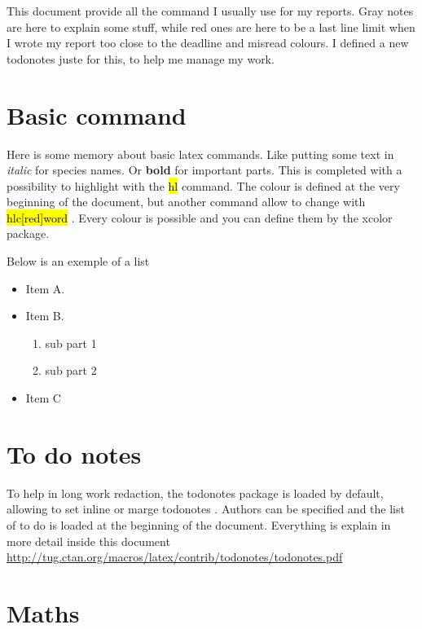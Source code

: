 \documentclass[12pt,a4paper,notitlepage,colorinlistoftodos]{article}
\newcommand{\hlc}[2][yellow]{ {\sethlcolor{#1} \hl{#2}} }
\newcommand{\imp}[1][this!]{ {\todo[inline,color=red]{\textbf{Check: #1}} } }
\begin{document}
This document provide all the command I usually use for my reports. Gray notes are here to explain some stuff, while red ones are here to be a last line limit when I wrote my report too close to the deadline and misread colours. I defined a new todonotes juste for this, to help me manage my work. 

\imp[imp command]

\section{Basic command}

Here is some memory about basic latex commands. Like putting some text in \textit{italic} for species names. Or \textbf{bold} for important parts. This is completed with a possibility to highlight with the \hl{hl} command. The colour is defined at the very beginning of the document, but another command allow to change with \hlc[red]{hlc[red]word}. Every colour is possible and you can define them by the xcolor package.

Below is an exemple of a list

\begin{itemize}
  \item Item A.
  \item Item B.
  \begin{enumerate}
  	\item sub part 1
  	\item sub part 2
  \end{enumerate}
  \item Item C
\end{itemize}

\section{To do notes}

To help in long work redaction, the todonotes package is loaded by default, allowing to set inline or marge todonotes . Authors can be specified and the list of to do is loaded at the beginning of the document. Everything is explain in more detail inside this document \url{http://tug.ctan.org/macros/latex/contrib/todonotes/todonotes.pdf}


% 

\section{Maths}
\end{document}

